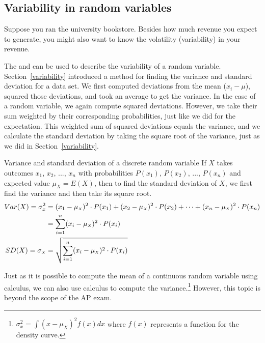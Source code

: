 


\D{\newpage}

\subsection{Variability in random variables}

Suppose you ran the university bookstore. Besides how much revenue you expect to generate, you might also want to know the volatility (variability) in your revenue.

The  and  can be used to describe the variability of a random variable. Section~\ref{variability}
introduced a method for finding the variance and standard deviation for a data set. We first computed deviations from the mean ($x_i - \mu$), squared those deviations, and took an average to get the variance. In the case of a random variable, we again compute squared deviations. However, we take their sum weighted by their corresponding probabilities, just like we did for the expectation. This weighted sum of squared deviations equals the variance, and we calculate the standard deviation by taking the square root of the variance, just as we did in Section~\ref{variability}.

\begin{onebox}{Variance and standard deviation of a discrete random variable}
If $X$ takes outcomes $x_1$, $x_2$, ..., $x_n$ with probabilities $P(x_1)$,  $P(x_2)$, ..., $P(x_n)$ and expected value $\mu_{\scriptscriptstyle{X}}=E(X)$, then to find the standard deviation of $X$, we first find the variance and then take its square root.
\begin{align*}
Var(X) = \sigma^2_x &= (x_1-\mu_{\scriptscriptstyle{X}})^2\cdot P(x_1) + (x_2-\mu_{\scriptscriptstyle{X}})^2\cdot P(x_2) + \cdots +  (x_n-\mu_{\scriptscriptstyle{X}})^2\cdot P(x_n) \notag \\
	&= \sum_{i=1}^{n} (x_i - \mu_{\scriptscriptstyle{X}})^2 \cdot P(x_i) \notag \\
SD(X) = \sigma_{\scriptscriptstyle{X}} &= \sqrt{ \sum_{i=1}^{n} (x_i - \mu_{\scriptscriptstyle{X}})^2 \cdot P(x_i)}
\end{align*}
\end{onebox}

Just as it is possible to compute the mean of a continuous random variable using calculus, we can also use calculus to compute the variance.\footnote{$\sigma^2_x = \int (x - \mu_{\scriptscriptstyle{X}})^2f(x)dx$ where $f(x)$ represents a function for the density curve.} However, this topic is beyond the scope of the AP exam.

